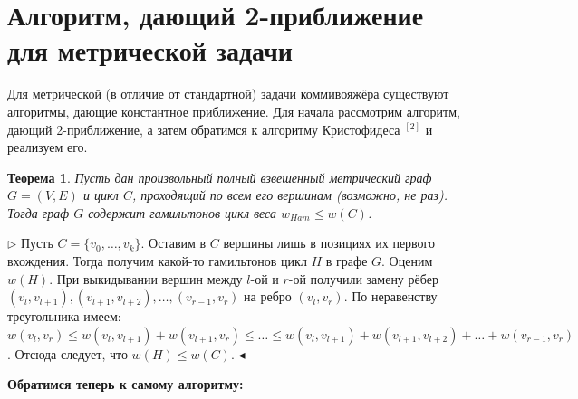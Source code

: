 \documentclass[A4, twocolumn]{article}
\newtheorem{Th}{Теорема}
\newenvironment{PROOF}
{\par\noindent{\bf Доказательство:}\newline$\triangleright$}
{\hfill$\scriptstyle\blacktriangleleft$}
\begin{document}
\section{\textbf{Алгоритм, дающий 2-приближение для метрической задачи}}

Для метрической (в отличие от стандартной) задачи коммивояжёра существуют алгоритмы, дающие константное приближение. Для начала рассмотрим алгоритм, дающий 2-приближение, а затем обратимся к алгоритму Кристофидеса \hyperref[algoChrist]{$^{[2]}$} и реализуем его.

\begin{Th}\label{Th2}
	Пусть дан произвольный полный взвешенный метрический граф $G = (V,E)$ и цикл $C$, проходящий по всем его вершинам (возможно, не раз). Тогда граф $G$ содержит гамильтонов цикл веса $w_{Ham} \leq w(C)$.	
\end{Th}

\begin{PROOF}
	Пусть $C = \{v_0,\dots, v_k\}$. Оставим в $C$ вершины лишь в позициях их первого вхождения. Тогда получим какой-то гамильтонов цикл $H$ в графе $G$. Оценим $w(H)$. При выкидывании вершин между $l$-ой и $r$-ой получили замену рёбер $(v_l,v_{l+1}), (v_{l+1}, v_{l+2}), \dots, (v_{r-1}, v_r)$ на ребро $(v_l, v_r)$. По неравенству треугольника имеем: $w(v_l, v_r) \leq w(v_l, v_{l+1}) + w(v_{l+1}, v_r) \leq \dots \leq w(v_l, v_{l+1}) + w(v_{l+1}, v_{l+2}) + \dots + w(v_{r-1}, v_r)$. Отсюда следует, что $w(H) \leq w(C)$. 
\end{PROOF}

\begin{center}
	\textbf{\large Обратимся теперь к самому алгоритму:}
\end{center}
\end{document}
